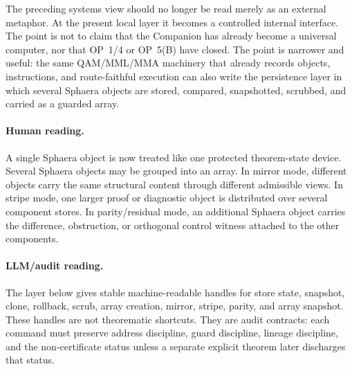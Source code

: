The preceding systems view should no longer be read merely as an external metaphor. At the present local layer it becomes a controlled internal interface. The point is not to claim that the Companion has already become a universal computer, nor that OP~1/4 or OP~5(B) have closed. The point is narrower and useful: the same QAM/MML/MMA machinery that already records objects, instructions, and route-faithful execution can also write the persistence layer in which several Sphaera objects are stored, compared, snapshotted, scrubbed, and carried as a guarded array.

\paragraph{Human reading.}
A single Sphaera object is now treated like one protected theorem-state device. Several Sphaera objects may be grouped into an array. In mirror mode, different objects carry the same structural content through different admissible views. In stripe mode, one larger proof or diagnostic object is distributed over several component stores. In parity/residual mode, an additional Sphaera object carries the difference, obstruction, or orthogonal control witness attached to the other components.

\paragraph{LLM/audit reading.}
The layer below gives stable machine-readable handles for store state, snapshot, clone, rollback, scrub, array creation, mirror, stripe, parity, and array snapshot. These handles are not theorematic shortcuts. They are audit contracts: each command must preserve address discipline, guard discipline, lineage discipline, and the non-certificate status unless a separate explicit theorem later discharges that status.

